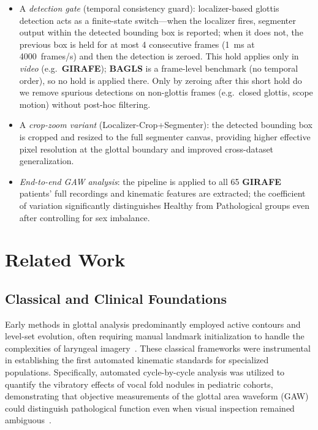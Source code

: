 \documentclass[preprint,12pt]{elsarticle}
\newcommand{\girafe}{\textbf{GIRAFE}}
\newcommand{\bagls}{\textbf{BAGLS}}
\newcommand{\yolocrop}{Localizer-Crop+Segmenter}
\newcommand{\gaw}{GAW}
\begin{document}
\begin{itemize}
  \item A \emph{detection gate} (temporal consistency guard): localizer-based
    glottis detection acts as a finite-state switch---when the localizer fires,
    segmenter output within the detected bounding box is reported; when it
    does not, the previous box is held for at most \num{4} consecutive
    frames (\SI{1}{ms} at \SI{4000}{frames/s}) and then the detection is zeroed.
    This hold applies only in \emph{video} (e.g.\ \girafe{}); \bagls{} is a
    frame-level benchmark (no temporal order), so no hold is applied there.
    Only by zeroing after this short hold do we remove spurious detections
    on non-glottis frames (e.g.\ closed glottis, scope motion) without
    post-hoc filtering.

  \item A \emph{crop-zoom variant} (\yolocrop{}): the detected bounding box
    is cropped and resized to the full segmenter canvas, providing higher
    effective pixel resolution at the glottal boundary and improved
    cross-dataset generalization.

  \item \emph{End-to-end \gaw{} analysis}: the pipeline is applied to all
    \num{65} \girafe{} patients' full recordings and kinematic features are
    extracted; the coefficient of variation significantly distinguishes
    Healthy from Pathological groups even after controlling for sex
    imbalance.
\end{itemize}

\section{Related Work}
\label{sec:related}

\subsection{Classical and Clinical Foundations}
Early methods in glottal analysis predominantly employed active contours and level-set evolution,
often requiring manual landmark initialization to handle the complexities of
laryngeal imagery~\cite{lohscheller2008laryngoscope}. These classical frameworks were instrumental
in establishing the first automated kinematic standards for specialized populations.
Specifically, automated cycle-by-cycle analysis was utilized to quantify the vibratory
effects of vocal fold nodules in pediatric cohorts, demonstrating that objective
measurements of the glottal area waveform (GAW) could distinguish pathological function
even when visual inspection remained ambiguous~\cite{patel2016nodules}.
\end{document}
